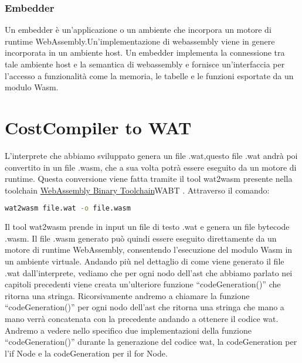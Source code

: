 \documentclass[../../main.tex]{subfiles}
\begin{document}
\subsubsection{Embedder}
Un embedder è un'applicazione o un ambiente che incorpora un motore di runtime WebAssembly.Un'implementazione di webassembly viene in genere incorporata in un ambiente host.
Un embedder implementa la connessione tra tale ambiente host e la semantica di webassembly e fornisce un'interfaccia per l'accesso a funzionalità come la memoria, le tabelle e le funzioni esportate da un modulo Wasm.\autocite{amslaurea20464}\autocite{DBLP:journals/corr/abs-2205-01183}

\section{CostCompiler to WAT}
L'interprete che abbiamo sviluppato genera un file .wat,questo file .wat andrà poi convertito in un file .wasm, che a sua volta potrà essere eseguito da un motore di runtime.
Questa conversione viene fatta tramite il tool wat2wasm presente nella toolchain \href{https://github.com/WebAssembly/wabt}{WebAssembly Binary Toolchain}{WABT} \autocite{jain2022webassembly}.
Attraverso il comando:
\begin{lstlisting}[language=bash]
    wat2wasm file.wat -o file.wasm
\end{lstlisting}
Il tool wat2wasm prende in input un file di testo .wat e genera un file bytecode .wasm. Il file .wasm generato può quindi essere eseguito direttamente da un motore di runtime WebAssembly, consentendo l'esecuzione del modulo Wasm in un ambiente virtuale.
Andando più nel dettaglio di come viene generato il file .wat dall'interprete, vediamo che per ogni nodo dell'ast che abbiamo parlato nei capitoli precedenti viene creata un'ulteriore funzione ``codeGeneration()'' che ritorna una stringa.
Ricorsivamente andremo a chiamare la funzione ``codeGeneration()'' per ogni nodo dell'ast che ritorna una stringa che mano a mano verrà concatenata con la precedente andando a ottenere il codice wat.
Andremo a vedere nello specifico due implementazioni della funzione ``codeGeneration()'' durante la generazione del codice wat, la codeGeneration per l'if Node e la codeGeneration per il for Node.
\end{document}
